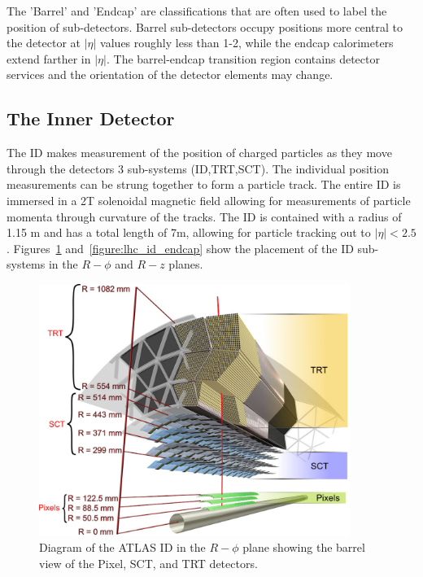 The 'Barrel' and 'Endcap' are classifications that are often used to label the position of sub-detectors. Barrel sub-detectors occupy positions more central to the detector at $|\eta|$ values roughly less than 1-2, while the endcap calorimeters extend farther in $|\eta|$. The barrel-endcap transition region contains detector services and the orientation of the detector elements may change. 

\subsection{The Inner Detector}

The ID makes measurement of the position of charged particles as they move through the detectors 3 sub-systems (ID,TRT,SCT). The individual position measurements can be strung together to form a particle track. The entire ID is immersed in a 2T solenoidal magnetic field allowing for measurements of particle momenta through curvature of the tracks. The ID is contained with a radius of 1.15 m and has a total length of 7m, allowing for particle tracking out to $|\eta| < 2.5$ . Figures~\ref{figure:lhc_id_barrel} and~\ref{figure:lhc_id_endcap} show the placement of the ID sub-systems in the $R-\phi$ and $R-z$ planes.  


\begin{figure}[!t]
\centering 
\includegraphics[width=0.9\textwidth]{figs/lhc/IDBarrel-eps-converted-to}
\caption{ Diagram of the ATLAS ID in the $R-\phi$ plane showing the barrel view of the Pixel, SCT, and TRT detectors.
}
\label{figure:lhc_id_barrel}
\end{figure}

